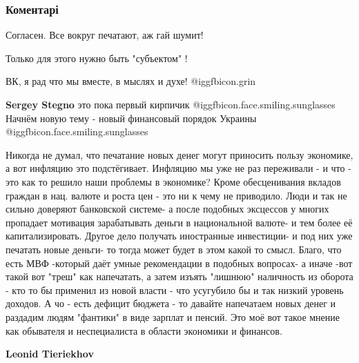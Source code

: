  
 
 
 
 
\subsubsection{Коментарі}
\label{sec:18_10_2021.fb.pozumentschikov_viktor.1.finansy.cmt}

\begin{itemize} %
Согласен. Все вокруг печатают, аж гай шумит!

Только для этого нужно быть "субъектом" !

ВК, я рад что мы вместе, в мыслях и духе!  @igg{fbicon.grin} 

\begin{itemize} %
\textbf{Sergey Stegno} это пока первый кирпичик @igg{fbicon.face.smiling.sunglasses}  Начнём новую тему - новый финансовый порядок Украины @igg{fbicon.face.smiling.sunglasses} 


Никогда не думал, что печатание новых денег могут приносить пользу экономике, а
вот инфляцию это подстёгивает. Инфляцию мы уже не раз переживали - и что - это
как то решило наши проблемы в экономике? Кроме обесценивания вкладов граждан в
нац. валюте и роста цен - это ни к чему не приводило. Люди и так не сильно
доверяют банковской системе- а после подобных эксцессов у многих пропадает
мотивация зарабатывать деньги в национальной валюте- и тем более её
капитализировать. Другое дело получать иностранные инвестиции- и под них уже
печатать новые деньги- то тогда может будет в этом какой то смысл. Благо, что
есть МВФ -который даёт умные рекомендации в подобных вопросах- а иначе -вот
такой вот "треш" как напечатать, а затем изъять "лишнюю" наличность из оборота
- кто то бы применил из новой власти - что усугубило бы и так низкий уровень
доходов. А чо - есть дефицит бюджета - то давайте напечатаем новых денег и
раздадим людям "фантики" в виде зарплат и пенсий. Это моё вот такое мнение как
обывателя и неспециалиста в области экономики и финансов.

\textbf{Leonid Tieriekhov} 


\end{itemize}
\end{itemize}
